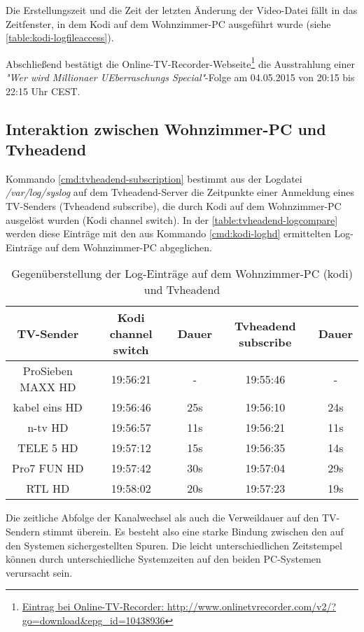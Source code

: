 Die Erstellungszeit und die Zeit der letzten Änderung der Video-Datei fällt in das Zeitfenster, in dem Kodi auf dem Wohnzimmer-PC ausgeführt wurde (siehe \autoref{table:kodi-logfileaccess}).

Abschließend bestätigt die Online-TV-Recorder-Webseite\footnote{\href{http://www.onlinetvrecorder.com/v2/?go=download\&epg\_id=10438936}{Eintrag bei Online-TV-Recorder: http://www.onlinetvrecorder.com/v2/?go=download\&epg\_id=10438936}} die Ausstrahlung einer \textit{"Wer wird Millionaer UEberraschungs Special"}-Folge am 04.05.2015 von 20:15 bis 22:15 Uhr CEST.

\subsection{Interaktion zwischen Wohnzimmer-PC und Tvheadend}

Kommando \autoref{cmd:tvheadend-subscription} bestimmt aus der Logdatei \textit{/var/log/syslog} auf dem Tvheadend-Server die Zeitpunkte einer Anmeldung eines TV-Senders (Tvheadend subscribe), die durch Kodi auf dem Wohnzimmer-PC ausgelöst wurden (Kodi channel switch). In der \autoref{table:tvheadend-logcompare} werden diese Einträge mit den aus Kommando \autoref{cmd:kodi-loghd} ermittelten Log-Einträge auf dem Wohnzimmer-PC abgeglichen.

\begin{table}[H]
\begin{tabular}{ccccc}
\hline 
TV-Sender & Kodi channel switch & Dauer & Tvheadend subscribe & Dauer \\ 
\hline 
ProSieben MAXX HD & 19:56:21 & - & 19:55:46 & - \\ 
\hline 
kabel eins HD & 19:56:46 & 25s & 19:56:10 & 24s \\ 
\hline 
n-tv HD & 19:56:57 & 11s & 19:56:21 & 11s \\ 
\hline 
TELE 5 HD & 19:57:12 & 15s & 19:56:35 & 14s \\ 
\hline 
Pro7 FUN HD & 19:57:42 & 30s & 19:57:04 & 29s \\ 
\hline 
RTL HD & 19:58:02 & 20s & 19:57:23 & 19s \\ 
\hline 
\end{tabular}
\caption{Gegenüberstellung der Log-Einträge auf dem Wohnzimmer-PC (kodi) und Tvheadend}
\label{table:tvheadend-logcompare}
\end{table}

Die zeitliche Abfolge der Kanalwechsel als auch die Verweildauer auf den TV-Sendern stimmt überein. Es besteht also eine starke Bindung zwischen den auf den Systemen sichergestellten Spuren. Die leicht unterschiedlichen Zeitstempel können durch unterschiedliche Systemzeiten auf den beiden PC-Systemen verursacht sein.

